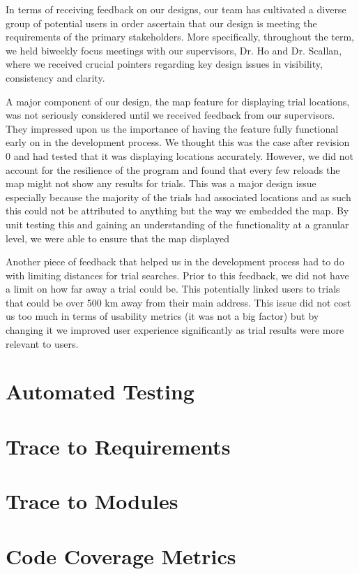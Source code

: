 \documentclass[12pt, titlepage]{article}
\begin{document}
In terms of receiving feedback on our designs, our team has cultivated a diverse group of potential users 
in order ascertain that our design is meeting the requirements of the primary stakeholders. 
More specifically, throughout the term, 
we held biweekly focus meetings with our supervisors, Dr. Ho and Dr. Scallan, where we received crucial 
pointers regarding key design issues in visibility, consistency and clarity. 

A major component of our design, the map feature for displaying trial locations, 
was not seriously considered until we received feedback from our supervisors. They impressed upon
us the importance of having the feature fully functional early on in the development process.
We thought this was the case after revision 0 and had tested that it was displaying locations
accurately. However, we did not account for the resilience of the program and found that every few reloads
the map might not show any results for trials. This was a major design issue
especially because the majority of the trials had associated locations and as such this could not be
attributed to anything but the way we embedded the map.  
By unit testing this and gaining an understanding of the functionality at a granular level, 
we were able to ensure that the map displayed 

Another piece of feedback that helped us in the development process
had to do with limiting distances for trial searches. Prior to this feedback, 
we did not have a limit on how far away a trial could be. This potentially linked 
users to trials that could be over 500 km away from their main address. This issue did not 
cost us too much in terms of usability metrics (it was not a big factor) but by changing it
we improved user experience significantly as trial results were more relevant to users. 


\section{Automated Testing}
		
\section{Trace to Requirements}
		
\section{Trace to Modules}		

\section{Code Coverage Metrics}
\end{document}
